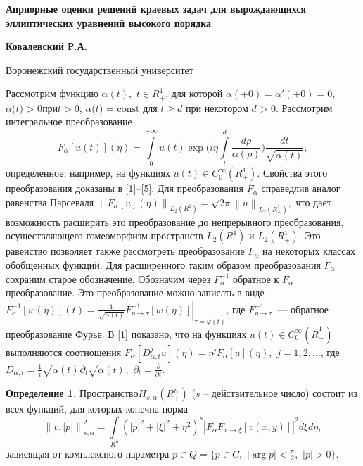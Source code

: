 
\begin{center}
\textbf{Априорные оценки решений краевых задач для вырождающихся
эллиптических уравнений высокого порядка}
\end{center}

\begin{center}
\textbf{Ковалевский Р.А.}
\end{center}

\begin{center}
Воронежский государственный университет
\end{center}


Рассмотрим функцию $\alpha (t),\,\,t \in R_ + ^1 $, для которой $\alpha ( +
0) = {\alpha }'( + 0) = 0$, $\alpha \mbox{(}t\mbox{) > 0}$при$t > 0$,
$\alpha \mbox{(}t\mbox{) = const}$ для $t \ge d$ при некотором $d\mbox{ >
0}$. Рассмотрим интегральное преобразование
\[
F_\alpha [u(t)](\eta ) = \int\limits_0^{ + \infty } {u(t)\exp (i\eta }
\int\limits_t^d {\frac{d\rho }{\alpha (\rho )}} )\frac{dt}{\sqrt {\alpha
(t)} },
\]
определенное, например,
на функциях $u(t) \in C_0^\infty (R_ + ^1
)$.
Свойства этого преобразования доказаны в
[1]--[5].
Для преобразования $F_\alpha $ справедлив аналог равенства Парсеваля
$\left\| {F_\alpha [u](\eta )} \right\|_{L_2 (R^1)} = \sqrt {2\pi } \left\|
u \right\|_{L_2 (R_ + ^1 )} ,$ что дает возможность расширить это
преобразование до непрерывного преобразования, осуществляющего гомеоморфизм
пространств $L_{2} (R^1)$ и $L_{2} (R_ + ^1 )$. Это равенство
позволяет также рассмотреть преобразование $F_\alpha $ на некоторых классах
обобщенных функций. Для расширенного таким образом
\linebreak
преобразования $F_\alpha
$ сохраним старое обозначение. Обозначим через $F_\alpha ^{ - 1} $ обратное
к $F_\alpha $ преобразование. Это преобразование можно записать в виде
$F_\alpha ^{ - 1} [w(\eta )](t) = \left. {\frac{1}{\sqrt {\alpha (t)}
}F_{\eta \to \tau }^{ - 1} [w(\eta )]} \right|_{\tau = \varphi (t)} $, где
$F_{\eta \to \tau }^{ - 1} $~--- обратное преобразование Фурье. В [1]
показано, что на функциях $u(t) \in C_0^\infty (\bar {R}_ + ^1 )$
выполняются соотношения
\linebreak
$F_\alpha [D_{\alpha ,t}^j u](\eta ) = \eta
^jF_\alpha [u](\eta ),\,\,j = 1,2,...$, где $D_{\alpha ,t} =
\frac{1}{i}\sqrt {\alpha (t)} \partial _t \sqrt {\alpha (t)}
,$ $\partial _t = \frac{\partial }{\partial t}.$

\textbf{Определение 1.} Пространство$H_{s,\alpha } (R_ + ^n )$ ($s$ --
действительное число) состоит из всех функций, для которых конечна норма
\[
\left\| {v,\left| p \right|} \right\|_{s,\alpha }^2 = \int\limits_{R^n}
{(\left| p \right|^2 + \left| \xi \right|^2 + \eta ^2)^s\left| {F_\alpha
F_{x \to \xi } [v(x,y)]} \right|^2d\xi d\eta } ,
\]
зависящая от комплексного параметра $p \in Q = \{p \in C,\,\,\left| {\arg p}
\right| < \frac{\pi }{2},\,\,\left| p \right| > 0\}$.

